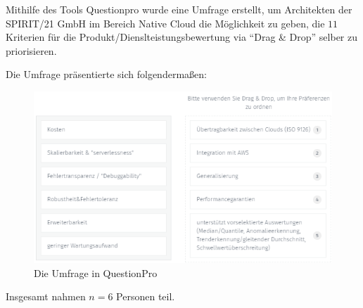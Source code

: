 \label{anhang:umfrage}
Mithilfe des Tools Questionpro wurde eine Umfrage erstellt, um Architekten der SPIRIT/21 GmbH im Bereich Native Cloud die Möglichkeit zu geben, die $11$ Kriterien für die Produkt/Dienslteistungsbewertung via \enquote{Drag \& Drop} selber zu priorisieren.

Die Umfrage präsentierte sich folgendermaßen:

\begin{figure}[H]
\centering
\includegraphics[width=\textwidth]{graphics/Umfrage-Darstellung.png}
\caption{Die Umfrage in QuestionPro}
\label{abb:Umfrage}
\end{figure}


Insgesamt nahmen $n = 6$ Personen teil. 

